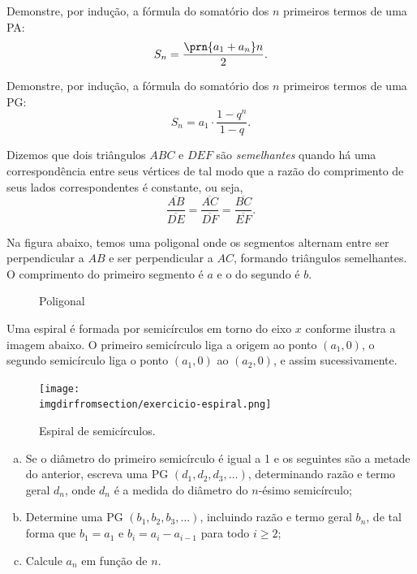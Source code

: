 \begin{exercise}
	Demonstre, por indução, a fórmula do somatório dos $n$ primeiros termos de uma PA:
	\[S_n = \frac {\prn {a_1+a_n}n} 2.\]
\end{exercise}

\begin{exercise}
	Demonstre, por indução, a fórmula do somatório dos $n$ primeiros termos de uma PG:
	\[S_n = a_1 \cdot \frac{1-q^n}{1-q}.\]
\end{exercise}

\begin{exercise}
   Dizemos que dois triângulos $ABC$ e $DEF$ são \emph{semelhantes} quando há uma correspondência entre seus vértices de tal modo que a razão do comprimento de seus lados correspondentes é constante, ou seja,
   $$ \dfrac{\overline{AB}}{\overline{DE}} = \dfrac{\overline{AC}}{\overline{DF}} = \dfrac{\overline{BC}}{\overline{EF}}.$$

    Na figura abaixo, temos uma poligonal onde os segmentos alternam entre ser perpendicular a $AB$ e ser perpendicular a $AC$, formando triângulos semelhantes. O comprimento do primeiro segmento é $a$ e o do segundo é $b$.
    \begin{figure}[H]
	\centering
        \caption{Poligonal}
        \label{fig:my_label}
    \end{figure}
\end{exercise}

\begin{exercise}\label{ex:espiral}
    Uma espiral é formada por semicírculos em torno do eixo $x$ conforme ilustra a imagem abaixo. O primeiro semicírculo liga a origem ao ponto $(a_1, 0)$, o segundo semicírculo liga o ponto $(a_1, 0)$ ao $(a_2, 0)$, e assim sucessivamente.
    \begin{figure}[H]
        \centering
        \label{fig:exercicio-espiral}
        \texttt{[image: \\imgdirfromsection/exercicio-espiral.png]}
		\caption{Espiral de semicírculos.}
    \end{figure}
    \begin{enumerate}[a)]
        \item Se o diâmetro do primeiro semicírculo é igual a 1 e os seguintes são a metade do anterior, escreva uma PG $(d_1, d_2, d_3 , \dots)$, determinando razão e termo geral $d_n$, onde $d_n$ é a medida do diâmetro do $n$-ésimo semicírculo;
        \item Determine uma PG $(b_1, b_2, b_3 , \dots)$, incluindo razão e termo geral $b_n$, de tal forma que $b_1 = a_1$ e $b_i = a_i - a_{i-1}$ para todo $i \geq 2$;
        \item Calcule $a_n$ em função de $n$.
        \end{enumerate}
\end{exercise}

